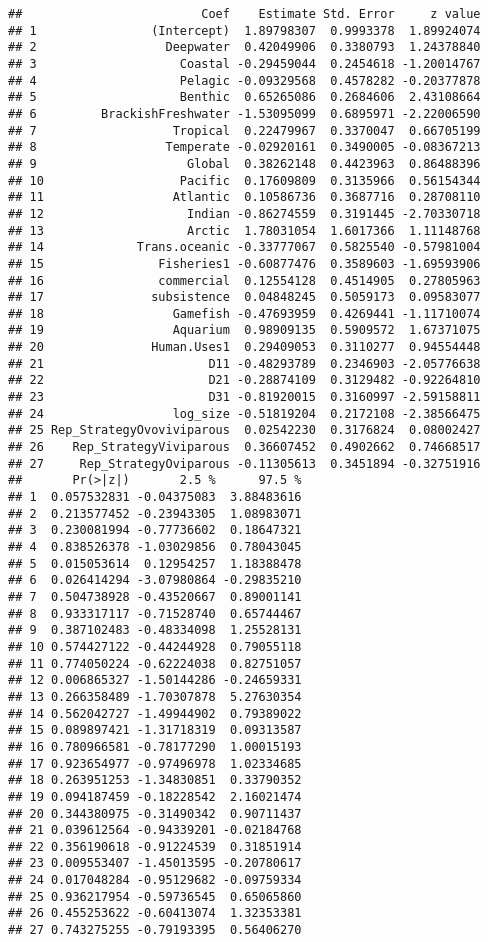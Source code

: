 \documentclass[]{article}
\begin{document}
\begin{verbatim}
##                         Coef    Estimate Std. Error     z value
## 1                (Intercept)  1.89798307  0.9993378  1.89924074
## 2                  Deepwater  0.42049906  0.3380793  1.24378840
## 3                    Coastal -0.29459044  0.2454618 -1.20014767
## 4                    Pelagic -0.09329568  0.4578282 -0.20377878
## 5                    Benthic  0.65265086  0.2684606  2.43108664
## 6         BrackishFreshwater -1.53095099  0.6895971 -2.22006590
## 7                   Tropical  0.22479967  0.3370047  0.66705199
## 8                  Temperate -0.02920161  0.3490005 -0.08367213
## 9                     Global  0.38262148  0.4423963  0.86488396
## 10                   Pacific  0.17609809  0.3135966  0.56154344
## 11                  Atlantic  0.10586736  0.3687716  0.28708110
## 12                    Indian -0.86274559  0.3191445 -2.70330718
## 13                    Arctic  1.78031054  1.6017366  1.11148768
## 14             Trans.oceanic -0.33777067  0.5825540 -0.57981004
## 15                Fisheries1 -0.60877476  0.3589603 -1.69593906
## 16                commercial  0.12554128  0.4514905  0.27805963
## 17               subsistence  0.04848245  0.5059173  0.09583077
## 18                  Gamefish -0.47693959  0.4269441 -1.11710074
## 19                  Aquarium  0.98909135  0.5909572  1.67371075
## 20               Human.Uses1  0.29409053  0.3110277  0.94554448
## 21                       D11 -0.48293789  0.2346903 -2.05776638
## 22                       D21 -0.28874109  0.3129482 -0.92264810
## 23                       D31 -0.81920015  0.3160997 -2.59158811
## 24                  log_size -0.51819204  0.2172108 -2.38566475
## 25 Rep_StrategyOvoviviparous  0.02542230  0.3176824  0.08002427
## 26    Rep_StrategyViviparous  0.36607452  0.4902662  0.74668517
## 27     Rep_StrategyOviparous -0.11305613  0.3451894 -0.32751916
##       Pr(>|z|)       2.5 %      97.5 %
## 1  0.057532831 -0.04375083  3.88483616
## 2  0.213577452 -0.23943305  1.08983071
## 3  0.230081994 -0.77736602  0.18647321
## 4  0.838526378 -1.03029856  0.78043045
## 5  0.015053614  0.12954257  1.18388478
## 6  0.026414294 -3.07980864 -0.29835210
## 7  0.504738928 -0.43520667  0.89001141
## 8  0.933317117 -0.71528740  0.65744467
## 9  0.387102483 -0.48334098  1.25528131
## 10 0.574427122 -0.44244928  0.79055118
## 11 0.774050224 -0.62224038  0.82751057
## 12 0.006865327 -1.50144286 -0.24659331
## 13 0.266358489 -1.70307878  5.27630354
## 14 0.562042727 -1.49944902  0.79389022
## 15 0.089897421 -1.31718319  0.09313587
## 16 0.780966581 -0.78177290  1.00015193
## 17 0.923654977 -0.97496978  1.02334685
## 18 0.263951253 -1.34830851  0.33790352
## 19 0.094187459 -0.18228542  2.16021474
## 20 0.344380975 -0.31490342  0.90711437
## 21 0.039612564 -0.94339201 -0.02184768
## 22 0.356190618 -0.91224539  0.31851914
## 23 0.009553407 -1.45013595 -0.20780617
## 24 0.017048284 -0.95129682 -0.09759334
## 25 0.936217954 -0.59736545  0.65065860
## 26 0.455253622 -0.60413074  1.32353381
## 27 0.743275255 -0.79193395  0.56406270
\end{verbatim}
\end{document}
